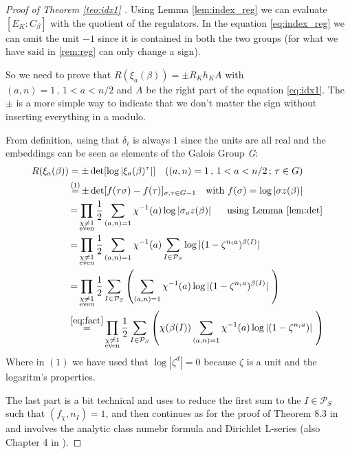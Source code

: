 \documentclass[]{article}
\theoremstyle{plain}
\theoremstyle{remark}
\theoremstyle{definition}
\newcommand{\PS}{\mathcal{P}_S}
\DeclareMathOperator*{\eqb }{=}
\begin{document}
	\begin{proof}[Proof of Theorem \ref{teo:idx1} ]
			Using Lemma \ref{lem:index_reg} we can evaluate $ [E_K : C_\beta ] $ with the quotient of the regulators. In the equation \ref{eq:index_reg} we can omit the unit $ -1 $ since it is contained in both the two groups (for what we have said in \ref{rem:reg} can only change a sign). 
			
			So we need to prove that $ R(\xi_a(\beta)) = \pm R_K h_K A $ with $ (a,n)=1 \, , \,1 < a <n/2 $ and $ A$ be the right part of the equation \ref{eq:idx1}. The $\pm$ is a more simple way to indicate that we don't matter the sign without inserting everything in a modulo. 
			
			From definition, using that $ \delta_i $ is always $ 1 $ since the units are all real and the embeddings can be seen as elements of the Galois Group \textit{G}:
			\begin{align*}
				R(\xi_a(\beta))  & = \pm \det [\log |  \xi_a(\beta)^{\tau}|]											\quad ((a,n)=1 \, , \,1 < a <n/2 \, ; \, \tau \in G) \\
										& \eqb^{(1)} \pm \det [ f(\tau \sigma ) - f(\tau ) ]_{\sigma , \tau \in G - 1} 		\quad \text{with } f(\sigma)= \log |\sigma z(\beta)|\\
										& \eqb \prod_{\substack{\chi \neq 1 \\ \text{even}}}  \frac{1}{2} \sum_{ ( a , n)= 1} \chi^{-1}(a ) \log |\sigma_a z(\beta)|\ \quad \text{ using Lemma \ref{lem:det} }\\
										& \eqb \prod_{\substack{\chi \neq 1 \\ \text{even}}}  \frac{1}{2} \sum_{ ( a , n)= 1} \chi^{-1}(a ) \sum_{I \in \PS} \log | ( 1 - \zeta ^{n_i a} )^{\beta (I)}|\ \\
										& \eqb \prod_{\substack{\chi \neq 1 \\ \text{even}}}  \frac{1}{2}\sum_{I \in \PS} \left( \sum_{ ( a , n)= 1} \chi^{-1}(a )  \log | ( 1 - \zeta ^{n_i a} )^{\beta (I)}|\ \right) \\
										& \eqb^{\ref{eq:fact}} \prod_{\substack{\chi \neq 1 \\ \text{even}}}  \frac{1}{2}\sum_{I \in \PS} \left( \chi(\beta (I))\sum_{ ( a , n)= 1} \chi^{-1}(a )  \log | ( 1 - \zeta ^{n_i a} )|\ \right) 
			\end{align*}
			Where in $ (1) $ we have used that $ \log | \zeta ^ d| =0 $ because $\zeta$ is a unit and the logaritm's properties. 
			
			The last part is a bit technical and uses \cite[Lemma~8.4]{CF} to reduce the first sum to the $ I \in \PS $ such that $ (f_\chi , n_I) = 1$, and then continues as for the proof of Theorem 8.3 in \cite[Pages~148-150]{CF} and involves the analytic class numebr formula %
			and Dirichlet L-series (also Chapter 4 in \cite{CF}). 
			\end{proof}
		
\end{document}
